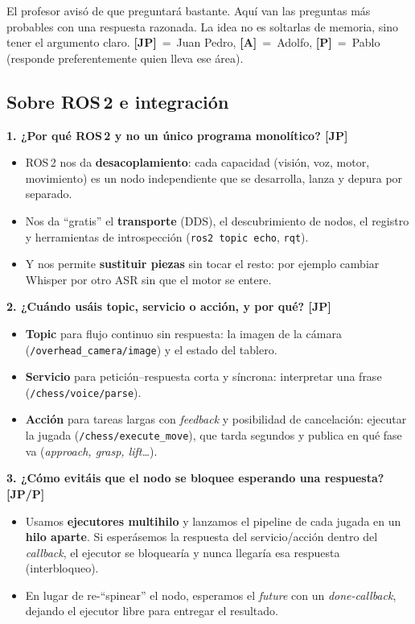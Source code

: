 \documentclass[11pt]{article}
\begin{document}
\noindent
El profesor avisó de que preguntará bastante. Aquí van las preguntas más
probables con una respuesta razonada. La idea no es soltarlas de memoria, sino
tener el argumento claro. \textbf{[JP]}~=~Juan Pedro, \textbf{[A]}~=~Adolfo,
\textbf{[P]}~=~Pablo (responde preferentemente quien lleva ese área).

\subsection*{Sobre ROS\,2 e integración}

\textbf{1. ¿Por qué ROS\,2 y no un único programa monolítico? [JP]}
\begin{itemize}
    \item ROS\,2 nos da \textbf{desacoplamiento}: cada capacidad (visión, voz,
          motor, movimiento) es un nodo independiente que se desarrolla,
          lanza y depura por separado.
    \item Nos da ``gratis'' el \textbf{transporte} (DDS), el descubrimiento de
          nodos, el registro y herramientas de introspección
          (\texttt{ros2 topic echo}, \texttt{rqt}).
    \item Y nos permite \textbf{sustituir piezas} sin tocar el resto: por
          ejemplo cambiar Whisper por otro ASR sin que el motor se entere.
\end{itemize}

\textbf{2. ¿Cuándo usáis topic, servicio o acción, y por qué? [JP]}
\begin{itemize}
    \item \textbf{Topic} para flujo continuo sin respuesta: la imagen de la
          cámara (\texttt{/overhead\_camera/image}) y el estado del tablero.
    \item \textbf{Servicio} para petición--respuesta corta y síncrona:
          interpretar una frase (\texttt{/chess/voice/parse}).
    \item \textbf{Acción} para tareas largas con \textit{feedback} y posibilidad
          de cancelación: ejecutar la jugada (\texttt{/chess/execute\_move}),
          que tarda segundos y publica en qué fase va (\textit{approach, grasp,
          lift\dots}).
\end{itemize}

\textbf{3. ¿Cómo evitáis que el nodo se bloquee esperando una respuesta? [JP/P]}
\begin{itemize}
    \item Usamos \textbf{ejecutores multihilo} y lanzamos el pipeline de cada
          jugada en un \textbf{hilo aparte}. Si esperásemos la respuesta del
          servicio/acción dentro del \textit{callback}, el ejecutor se
          bloquearía y nunca llegaría esa respuesta (interbloqueo).
    \item En lugar de re-``spinear'' el nodo, esperamos el \textit{future} con un
          \textit{done-callback}, dejando el ejecutor libre para entregar el
          resultado.
\end{itemize}
\end{document}
